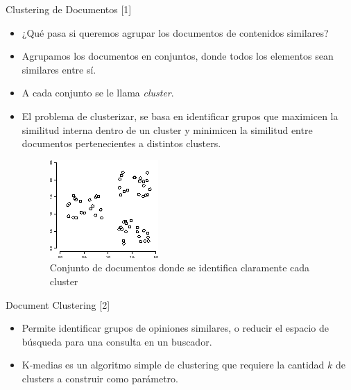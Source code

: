 \documentclass[handout]{beamer}
\begin{document}
\begin{frame}{Clustering de Documentos [1]}
\footnotesize{
\begin{itemize}
 \item ¿Qué pasa si queremos agrupar los documentos de contenidos similares?
 \item Agrupamos los documentos en conjuntos, donde todos los elementos sean similares entre sí. 
 \item A cada conjunto se le llama  \emph{cluster}. 
 \item El problema de clusterizar, se basa en identificar grupos que maximicen la similitud interna dentro de un cluster y minimicen la similitud entre documentos  pertenecientes a distintos clusters.
\begin{figure}[h!]
	\centering
	\includegraphics[scale=0.6]{pics/cluster.png}
	\caption{ Conjunto de documentos donde se identifica claramente cada cluster}
\end{figure}
 
\end{itemize}


}
 
\end{frame}

\begin{frame}{Document Clustering [2]}
\footnotesize{
\begin{itemize}
 \item Permite identificar grupos de opiniones similares, o reducir el espacio de búsqueda para una consulta en un buscador. 
 \item K-medias es un algoritmo simple de clustering que requiere la cantidad $k$ de clusters a construir como parámetro.

\end{itemize}
}
\end{frame}
\end{document}
